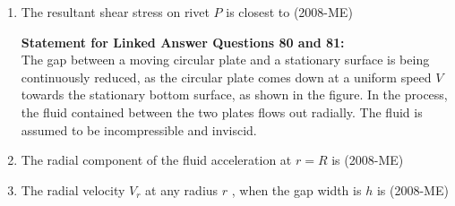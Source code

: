 \documentclass[journal]{IEEEtran}
\begin{document}
\begin{enumerate}
\begin{enumerate}
 \end{enumerate}
 \item The resultant shear stress on rivet $P$
 is closest to \hfill (2008-ME)
 \begin{enumerate}
 \end{enumerate}
\textbf{Statement for Linked Answer Questions 80 and 81:} \\
The gap between a moving circular plate and a stationary surface is being continuously reduced, as the circular plate comes down at a uniform speed $V$
 towards the stationary bottom surface, as shown in the figure. In the process, the fluid contained between the two plates flows out radially. The fluid is assumed to be incompressible and inviscid. 
 
 \item The radial component of the fluid acceleration at $r = R$
 is \hfill (2008-ME)
 \begin{enumerate}
 \end{enumerate}
\item The radial velocity $V_r$
 at any radius $r$
, when the gap width is $h$
 is \hfill (2008-ME)
 \begin{enumerate}
 \end{enumerate}

\end{enumerate}
\end{document}
